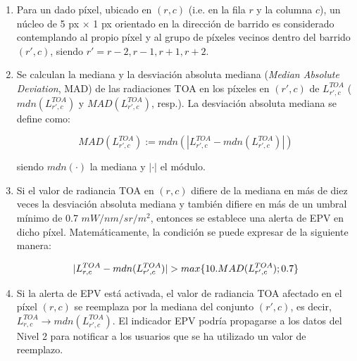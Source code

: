     \begin{enumerate}
        \item Para un dado píxel, ubicado en $(r,c)$ (i.e. en la fila $r$ y la columna $c$), un núcleo de 5 px $\times$ 1 px orientado en la dirección de barrido es considerado contemplando al propio píxel y al grupo de píxeles vecinos dentro del barrido $(r',c)$, siendo $r'={r-2,r-1,r+1,r+2}$.
        
        \item Se calculan la mediana y la desviación absoluta mediana (\textit{Median Absolute Deviation}, MAD) de las radiaciones TOA en los píxeles en $(r',c)$ de $L^{TOA}_{r',c}$ ($ mdn(L^{TOA}_{r', c}) $ y $ MAD(L^{TOA}_{r',c})$, resp.). La desviación absoluta mediana se define como:
    
        \begin{equation}
            MAD(L^{TOA}_{r',c}) := mdn( | L^{TOA}_{r',c} - mdn(L^{TOA}_{r',c}) | )
            \label{ppe:eq:mad}
        \end{equation}

        \noindent
        siendo $mdn(\cdot)$ la mediana y $|\cdot|$ el módulo.

        \item Si el valor de radiancia TOA en $(r,c)$ difiere de la mediana en más de diez veces la desviación absoluta mediana y también difiere en más de un umbral mínimo de 0.7 $mW/nm/sr/m^{2}$, entonces se establece una alerta de EPV en dicho píxel. Matemáticamente, la condición se puede expresar de la siguiente manera:

        \begin{equation}
            |L^{TOA}_{r,c} - mdn(L^{TOA}_{r',c}) | > \\ max\{10.MAD(L^{TOA}_{r',c}) ; 0.7\}
            \label{ppe:eq:ppr}
        \end{equation}
    
        \item Si la alerta de EPV está activada, el valor de radiancia TOA afectado en el píxel $(r,c)$ se reemplaza por la mediana del conjunto $(r',c)$, es decir, $L^{TOA}_{r,c}\rightarrow mdn(L^{TOA}_{r',c})$. El indicador EPV podría propagarse a los datos del Nivel 2 para notificar a los usuarios que se ha utilizado un valor de reemplazo.
    
    \end{enumerate}

